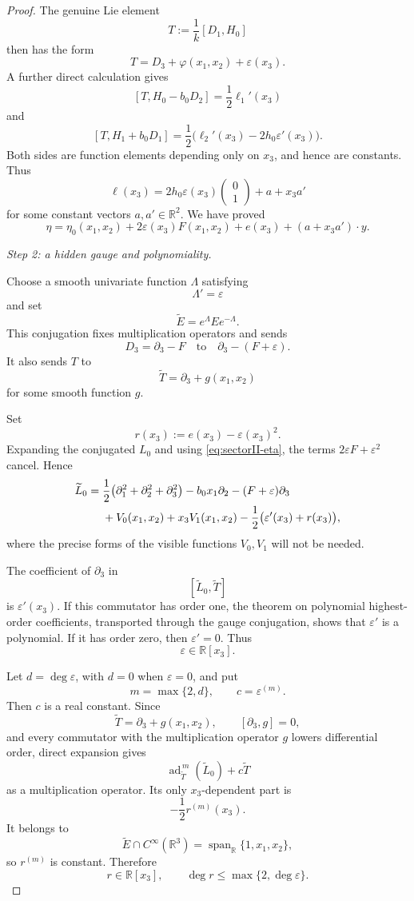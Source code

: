 \documentclass[11pt,a4paper]{article}
\numberwithin{equation}{section}
\theoremstyle{journalplain}
\theoremstyle{journaldef}
\begin{document}
\begin{proof}
The genuine Lie element
\[
T:=\frac1k[D_1,H_0]
\]
then has the form
\[
T=D_3+\varphi(x_1,x_2)+\varepsilon(x_3).
\]
A further direct calculation gives
\[
[T,H_0-b_0D_2]=\frac12\ell_1'(x_3)
\]
and
\[
[T,H_1+b_0D_1]
=\frac12\bigl(\ell_2'(x_3)-2h_0\varepsilon'(x_3)\bigr).
\]
Both sides are function elements depending only on \(x_3\), and hence
are constants. Thus
\[
\ell(x_3)
=2h_0\varepsilon(x_3)
\begin{pmatrix}0\\1\end{pmatrix}
+a+x_3a'
\]
for some constant vectors \(a,a'\in\mathbb R^2\). We have proved
\begin{equation}
\eta
=\eta_0(x_1,x_2)
+2\varepsilon(x_3)F(x_1,x_2)
+e(x_3)
+(a+x_3a')\cdot y.
\label{eq:sectorII-eta}
\end{equation}

\medskip
\noindent\emph{Step 2: a hidden gauge and polynomiality.}

Choose a smooth univariate function \(\Lambda\) satisfying
\[
\Lambda'=\varepsilon
\]
and set
\[
\widetilde E=e^\Lambda Ee^{-\Lambda}.
\]
This conjugation fixes multiplication operators and sends
\[
D_3=\partial_3-F
\quad\text{to}\quad
\partial_3-(F+\varepsilon).
\]
It also sends \(T\) to
\[
\widetilde T=\partial_3+g(x_1,x_2)
\]
for some smooth function \(g\).

Set
\[
r(x_3):=e(x_3)-\varepsilon(x_3)^2.
\]
Expanding the conjugated \(L_0\) and using
\eqref{eq:sectorII-eta}, the terms
\(2\varepsilon F+\varepsilon^2\) cancel. Hence
\begin{align}
\widetilde L_0={}&
\frac12\bigl(\partial_1^2+\partial_2^2+\partial_3^2\bigr)
-b_0x_1\partial_2-(F+\varepsilon)\partial_3\notag\\
&+V_0(x_1,x_2)+x_3V_1(x_1,x_2)
-\frac12\bigl(\varepsilon'(x_3)+r(x_3)\bigr),
\label{eq:sectorII-L}
\end{align}
where the precise forms of the visible functions \(V_0,V_1\) will not
be needed.

The coefficient of \(\partial_3\) in
\[
[\widetilde L_0,\widetilde T]
\]
is \(\varepsilon'(x_3)\). If this commutator has order one, the theorem
on polynomial highest-order coefficients, transported through the gauge
conjugation, shows that \(\varepsilon'\) is a polynomial. If it has order
zero, then \(\varepsilon'=0\). Thus
\[
\varepsilon\in\mathbb R[x_3].
\]

Let \(d=\deg\varepsilon\), with \(d=0\) when \(\varepsilon=0\), and put
\[
m=\max\{2,d\},
\qquad
c=\varepsilon^{(m)}.
\]
Then \(c\) is a real constant. Since
\[
\widetilde T=\partial_3+g(x_1,x_2),
\qquad
[\partial_3,g]=0,
\]
and every commutator with the multiplication operator \(g\) lowers
differential order, direct expansion gives
\[
\operatorname{ad}_{\widetilde T}^{\,m}(\widetilde L_0)
+c\widetilde T
\]
as a multiplication operator. Its only \(x_3\)-dependent part is
\[
-\frac12r^{(m)}(x_3).
\]
It belongs to
\[
\widetilde E\cap C^\infty(\mathbb R^3)
=\operatorname{span}_{\mathbb R}\{1,x_1,x_2\},
\]
so \(r^{(m)}\) is constant. Therefore
\[
r\in\mathbb R[x_3],
\qquad
\deg r\le\max\{2,\deg\varepsilon\}.
\]


\end{proof}
\end{document}
